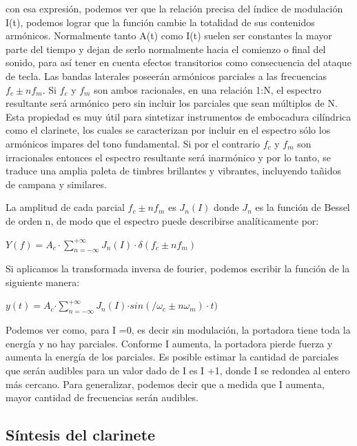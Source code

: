 \documentclass[../ASSD_TP2.tex]{subfiles}
\begin{document}
con esa expresión, podemos ver que la relación precisa del índice
de modulación I(t), podemos lograr que la función cambie la totalidad
de sus contenidos armónicos. Normalmente tanto A(t) como I(t) suelen
ser constantes la mayor parte del tiempo y dejan de serlo normalmente
hacia el comienzo o final del sonido, para así tener en cuenta efectos
transitorios como consecuencia del ataque de tecla. Las bandas laterales
poseerán armónicos parciales a las frecuencias $f_{c}\pm nf_{m}$.
Si $f_{c}$ y $f_{m}$ son ambos racionales, en una relación 1:N,
el espectro resultante será armónico pero sin incluir los parciales
que sean múltiplos de N. Esta propiedad es muy útil para sintetizar
instrumentos de embocadura cilíndrica como el clarinete, los cuales
se caracterizan por incluir en el espectro sólo los armónicos impares
del tono fundamental. Si por el contrario $f_{c}$ y $f_{m}$ son
irracionales entonces el espectro resultante será inarmónico y por
lo tanto, se traduce una amplia paleta de timbres brillantes y vibrantes,
incluyendo tañidos de campana y similares.

La amplitud de cada parcial $f_{c}\pm nf_{m}$ es $J_{n}(I)$ donde
$J_{n}$ es la función de Bessel de orden n, de modo que el espectro
puede describirse analíticamente por:
\begin{center}
{\Large{}$Y(f)=A_{c}\cdot\sum_{n=-\infty}^{+\infty}J_{n}(I)\cdot\delta(f_{c}\pm nf_{m})$}{\Large\par}
\par\end{center}

Si aplicamos la transformada inversa de fourier, podemos escribir
la función de la siguiente manera:
\begin{center}
{\Large{}$y(t)=A_{c}\text{·}\sum_{n=-\infty}^{+\infty}J_{n}(I)\text{·}sin(/\omega_{c}\pm n\omega_{m})\cdot t)$}{\Large\par}
\par\end{center}

Podemos ver como, para I =0, es decir sin modulación, la portadora
tiene toda la energía y no hay parciales. Conforme I aumenta, la portadora
pierde fuerza y aumenta la energía de los parciales. Es posible estimar
la cantidad de parciales que serán audibles para un valor dado de
I es I +1, donde I se redondea al entero más cercano. Para generalizar,
podemos decir que a medida que I aumenta, mayor cantidad de frecuencias
serán audibles.

\subsection{Síntesis del clarinete}
\end{document}
